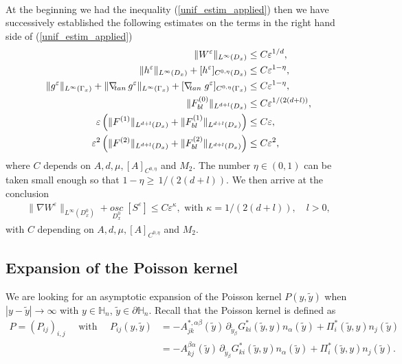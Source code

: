 \documentclass[11pt, reqno]{amsart}
\theoremstyle{definition}
\theoremstyle{remark}
\numberwithin{equation}{section}
\begin{document}
	\\
	At the beginning we had the  inequality (\ref{unif_estim_applied})
	then we have successively established the following estimates on the terms in the right hand side of (\ref{unif_estim_applied})
	\begin{align*}
		\| W^{\varepsilon}\|_{L^\infty(D_x)}&\leq C\varepsilon^{1/d},  \\
		\| h^\varepsilon \|_{L^\infty(D_x)} +  [h^\varepsilon]_{C^{0,\eta}(D_x)} &\leq C\varepsilon^{1-\eta}, \\
		\| g^\varepsilon \|_{L^\infty(\Gamma_x)} + \| \nabla_{\!\!\textup{ tan}} \, g^\varepsilon \|_{L^\infty(\Gamma_x)} + [\nabla_{\!\!\textup{ tan}}\; g^\varepsilon]_{C^{0,\eta}(\Gamma_x)} &\leq  C\varepsilon^{1-\eta},\\
		\| F^{(0)}_{bl} \|_{L^{d+l}(D_x)}&\leq  C\varepsilon^{1/(2(d+l))},  \\
		\varepsilon  \left(\| F^{(1)} \|_{L^{d+l}(D_x)}+ \| F^{(1)}_{bl} \|_{L^{d+l}(D_x)} \right)&\leq C \varepsilon,\nonumber\\
		\varepsilon^2 \left(\| F^{(2)} \|_{L^{d+l}(D_x)}+ \| F^{(2)}_{bl} \|_{L^{d+l}(D_x)} \right) &\leq C\varepsilon^2,
	\end{align*}
	where $C$ depends on $A, d, \mu, [A]_{C^{0,\eta}}$ and $M_2$.
	The number $\eta\in (0,1)$ can be taken small enough so that $1-\eta \geq \, 1/(2(d+l))$. We then arrive at the conclusion
	\begin{align}
		\|\nabla W^{\varepsilon}\|_{L^\infty(D_x^0)} + \underset{D_x^0}{osc} \;   [S^\varepsilon] \leq   C \varepsilon^\kappa, \mbox{ with } \kappa=1/(2(d+l)),\quad l>0,
	\end{align}
		with $C$ depending on $A, d, \mu, [A]_{C^{0,\eta}}$ and $M_2$.
	
	\subsection{Expansion of the Poisson kernel }
	\noindent We are looking for an asymptotic expansion of the Poisson kernel $P(y,\tilde{y})$ when $|y-\tilde{y}|\rightarrow \infty$ with  $y\in\mathbb{H}_n$, $\tilde{y}\in \partial\mathbb{H}_n$.	Recall that the Poisson kernel is defined as
	\begin{align*}
		P=(P_{ij})_{i,j}\quad \mbox{ with } \quad 	P_{ij}(y,\tilde{y})
		&=-A_{jk}^{*,\alpha\beta}(\tilde{y})\, \partial_{\tilde{y}_\beta}G_{ki}^*(\tilde{y},y) n_\alpha (\tilde{y})+ \Pi_i^*(\tilde{y},y ) n_j(\tilde{y})\\
		&=-A_{kj}^{\beta\alpha}(\tilde{y})\, \partial_{\tilde{y}_\beta}G_{ki}^*(\tilde{y},y) n_\alpha (\tilde{y})+ \Pi_i^*(\tilde{y},y ) n_j(\tilde{y}).
	\end{align*}
	
\end{document}

